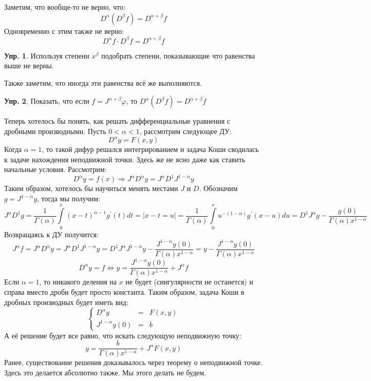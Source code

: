 \documentclass[12pt]{article}
\theoremstyle{definition}
\newtheorem{exrc}{Упр.}
\newcommand{\ddint}[2]{\displaystyle\int\limits_{#1}^{#2}}
\begin{document}
Заметим, что вообще-то не верно, что:
$$
	D^{\alpha}(D^{\beta}f) = D^{\alpha + \beta}f
$$
Одновременно с этим также не верно:
$$
	D^{\alpha}f{\cdot}D^{\beta}f = D^{\alpha + \beta}f
$$

\begin{exrc}
	Используя степени $x^{\beta}$ подобрать степени, показывающие что равенства выше не верны.
\end{exrc}
Также заметим, что иногда эти равенства всё же выполняются.
\begin{exrc}
	Показать, что если $f = J^{\alpha + \beta}\varphi$, то $D^{\alpha}(D^{\beta}f) = D^{\alpha + \beta}f$
\end{exrc}

Теперь хотелось бы понять, как решать дифференциальные уравнения с дробными производными. Пусть $0 < \alpha <1$, рассмотрим следующее ДУ:
$$
	D^{\alpha}y = F(x,y)
$$
Когда $\alpha = 1$, то такой дифур решался интегрированием и задача Коши сводилась к задаче нахождения неподвижной точки. Здесь же не ясно даже как ставить начальные условия. Рассмотрим:
$$
	D^{\alpha}y = f(x) \Rightarrow J^{\alpha}D^{\alpha}y = J^{\alpha}D^{1}J^{1 - \alpha}y
$$
Таким образом, хотелось бы научиться менять местами $J$ и $D$. Обозначим $g = J^{1 - \alpha}y$, тогда мы получим:
$$
	J^{\alpha}D^{1}g = \dfrac{1}{\Gamma(\alpha)}\ddint{0}{x}(x-t)^{\alpha - 1}g^\prime(t)dt = \big|x-t = u\big| = \dfrac{1}{\Gamma(\alpha)}\ddint{0}{x}u^{-(1 -\alpha)}g^{\prime}(x-u)du = D^1 J^{\alpha}g - \dfrac{g(0)}{\Gamma(\alpha)x^{1 - \alpha}} 
$$
Возвращаясь к ДУ получится:
$$
	J^{\alpha}f = J^{\alpha}D^{\alpha}y =  J^{\alpha}D^{1}J^{1 - \alpha}y = D^{1}J^{\alpha}J^{1 - \alpha}y - \dfrac{J^{1-\alpha}y(0)}{\Gamma(\alpha)x^{1 - \alpha}} = y -\dfrac{J^{1-\alpha}y(0)}{\Gamma(\alpha)x^{1 - \alpha}}
$$
$$
	D^{\alpha}y = f \Leftrightarrow y = \dfrac{J^{1-\alpha}y(0)}{\Gamma(\alpha)x^{1 - \alpha}} + J^{\alpha}f
$$
Если $\alpha = 1$, то никакого деления на $x$ не будет (сингулярности не останется) и справа вместо дроби будет просто константа. Таким образом, задача Коши в дробных производных будет иметь вид:
$$
	\left\{
	\begin{array}{lll}
		D^\alpha y &=& F(x,y) \\
		J^{1 - \alpha}y(0) &=& b
	\end{array}
	\right.
$$
А её решение будет все равно, что искать следующую неподвижную точку:
$$
	y = \dfrac{b}{\Gamma(\alpha)x^{1- \alpha}} + J^{\alpha}F(x,y)
$$
Ранее, существование решения доказывалось через теорему о неподвижной точке. Здесь это делается абсолютно также. Мы этого делать не будем.
\end{document}
